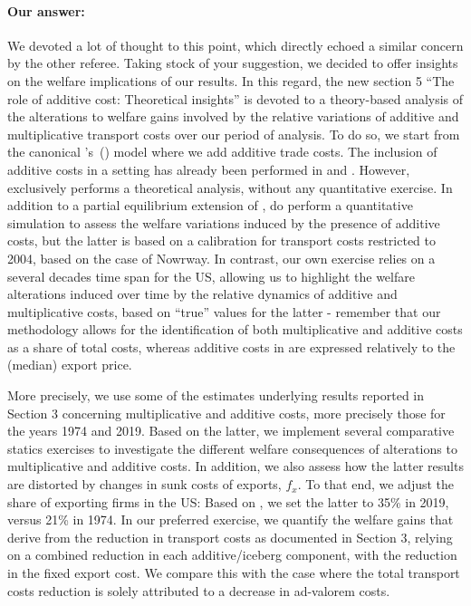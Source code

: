 \documentclass[a4paper,11pt]{article}
\newcommand\cites[1]{\citeauthor{#1}'s\ (\citeyear{#1})}
\begin{document}
\paragraph{Our answer:}
\noindent We devoted a lot of thought to this point, which directly echoed a similar concern by the other referee. Taking stock of your suggestion, we decided to offer insights on the welfare implications of our results. In this regard, the new section 5 ``The role of additive cost: Theoretical insights'' is devoted to a theory-based analysis of the alterations to welfare gains involved by the relative variations of additive and multiplicative transport costs over our period of analysis. To do so, we start from the canonical \cites{melitz} model where we add additive trade costs. The inclusion of additive costs in a \citet{melitz} setting has already been performed in \citet{sorensen2014} and \citet{Irrazabal_2015}. However, \citet{sorensen2014} exclusively performs a theoretical analysis, without any quantitative exercise. In addition to a partial equilibrium extension of \citet{melitz}, \citet{Irrazabal_2015} do perform a quantitative simulation to assess the welfare variations induced by the presence of additive costs, but the latter is based on a calibration for transport costs restricted to 2004, based on the case of Nowrway. In contrast, our own exercise relies on a several decades time span for the US, allowing us to highlight the welfare alterations induced over time by the relative dynamics of additive and multiplicative costs, based on ``true'' values for the latter - remember that our methodology allows for the identification of both multiplicative and additive costs as a share of total costs, whereas additive costs in \citet{Irrazabal_2015} are expressed relatively to the (median) export price.

More precisely, we use some of the estimates underlying results reported in Section 3 concerning multiplicative and additive costs, more precisely those for the years 1974 and 2019. Based on the latter, we implement several comparative statics exercises to investigate the different welfare consequences of alterations to multiplicative and additive costs. In addition, we also assess how the latter results are distorted by changes in sunk costs of exports, $f_{x}$. To that end, we adjust the share of exporting firms in the US: Based on \citet{Lincoln_McCallum2018}, we set the latter to 35\% in 2019, versus 21\% in 1974. In our preferred exercise, we quantify the welfare gains that derive from the reduction in transport costs as documented in Section 3, relying on a combined reduction in each additive/iceberg component, with the reduction in the fixed export cost. We compare this with the case where the total transport costs reduction is solely attributed to a decrease in ad-valorem costs.
\end{document}
